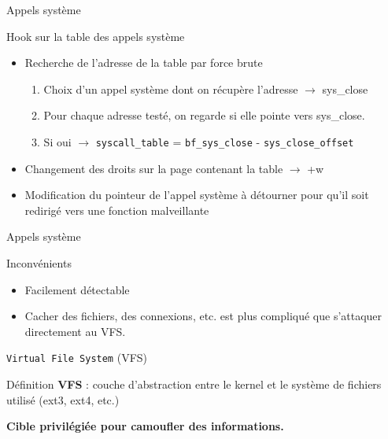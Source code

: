 \documentclass[10pt]{beamer}
\begin{document}
	\begin{frame}{Appels système}
		\begin{alertblock}{Hook sur la table des appels système}
	    \end{alertblock}
		\vspace{-0.60cm}
		\begin{itemize}
			\item Recherche de l'adresse de la table par force brute
			\begin{enumerate}
				\item Choix d'un appel système dont on récupère l'adresse $\rightarrow$ \alert{sys\_close}
				\item Pour chaque adresse testé, on regarde si elle pointe vers \alert{sys\_close}.
				\item Si oui $\rightarrow$ \texttt{syscall\_table} = \texttt{bf\_sys\_close} - \texttt{sys\_close\_offset}
			\end{enumerate}
			\item Changement des droits sur la page contenant la table $\rightarrow$ \alert{+w}
			\item Modification du pointeur de l'appel système à détourner pour qu'il soit redirigé vers une fonction malveillante
		\end{itemize}
	\end{frame}

	\begin{frame}{Appels système}

		\begin{alertblock}{Inconvénients}
	    \end{alertblock}
		\vspace{-0.60cm}
		\begin{itemize}
			\item Facilement détectable
			\item Cacher des fichiers, des connexions, etc. est plus compliqué que s'attaquer directement au VFS.
		\end{itemize}
	\end{frame}

	\begin{frame}{\texttt{Virtual File System} (VFS)}
		\begin{alertblock}{Définition}
			\textbf{VFS} : couche d'abstraction entre le kernel et le système de fichiers utilisé (ext3, ext4, etc.)
	    \end{alertblock}	 
		\textbf{Cible privilégiée pour camoufler des informations.}
	\end{frame}
\end{document}
